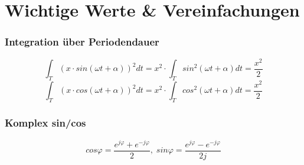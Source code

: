 
\section*{Wichtige Werte \& Vereinfachungen}

\subsubsection*{Integration über Periodendauer}
$$\int_T (x \cdot sin(\omega t + \alpha))^2 dt = x^2 \cdot \int_T sin^2(\omega t +\alpha) dt = \frac{x^2}{2}$$
$$\int_T (x \cdot cos(\omega t+\alpha))^2 dt = x^2 \cdot \int_T cos^2(\omega t+\alpha) dt = \frac{x^2}{2}$$


\subsubsection*{Komplex sin/cos}

$$cos \varphi = \frac{e^{j\varphi}+ e^{-j\varphi}}{2}, \; sin \varphi = \frac{e^{j\varphi} - e^{-j\varphi}}{2j} $$

